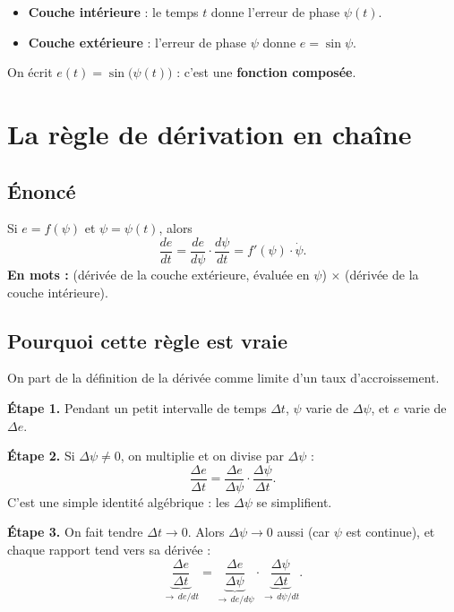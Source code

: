 \documentclass[11pt,a4paper]{article}
\numberwithin{equation}{section}
\begin{document}
\begin{itemize}
  \item \textbf{Couche intérieure} : le temps $t$ donne l'erreur de phase $\psi(t)$.
  \item \textbf{Couche extérieure} : l'erreur de phase $\psi$ donne $e=\sin\psi$.
\end{itemize}
On écrit $e(t) = \sin\big(\psi(t)\big)$ : c'est une \textbf{fonction composée}.

\section{La règle de dérivation en chaîne}

\subsection{Énoncé}
Si $e=f(\psi)$ et $\psi=\psi(t)$, alors
\begin{equation}\label{eq:chaine}
\boxed{\frac{de}{dt} = \frac{de}{d\psi}\cdot\frac{d\psi}{dt} = f'(\psi)\cdot\dot\psi .}
\end{equation}
\textbf{En mots :} (dérivée de la couche extérieure, évaluée en $\psi$) $\times$ (dérivée de la couche intérieure).

\subsection{Pourquoi cette règle est vraie}
On part de la définition de la dérivée comme limite d'un taux d'accroissement.

\textbf{Étape 1.} Pendant un petit intervalle de temps $\Delta t$, $\psi$ varie de $\Delta\psi$,
et $e$ varie de $\Delta e$.

\textbf{Étape 2.} Si $\Delta\psi\neq0$, on multiplie et on divise par $\Delta\psi$ :
\begin{equation}
\frac{\Delta e}{\Delta t} = \frac{\Delta e}{\Delta\psi}\cdot\frac{\Delta\psi}{\Delta t}.
\end{equation}
C'est une simple identité algébrique : les $\Delta\psi$ se simplifient.

\textbf{Étape 3.} On fait tendre $\Delta t\to0$. Alors $\Delta\psi\to0$ aussi (car $\psi$ est continue), et chaque
rapport tend vers sa dérivée :
\begin{equation}
\underbrace{\frac{\Delta e}{\Delta t}}_{\to\,de/dt} = \underbrace{\frac{\Delta e}{\Delta\psi}}_{\to\,de/d\psi}\cdot\underbrace{\frac{\Delta\psi}{\Delta t}}_{\to\,d\psi/dt}.
\end{equation}
\end{document}
